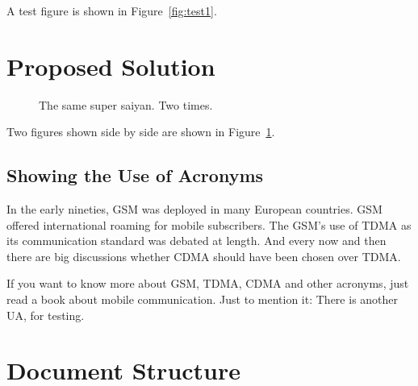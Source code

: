 A test figure is shown in Figure~\ref{fig:test1}.

\section{Proposed Solution} 

\blindtext
\blindtext

\begin{figure}[!ht]
    \centering
    \qquad
    \caption[Short Caption]{The same super saiyan. Two times.}        
    \label{fig:test2}
\end{figure}

Two figures shown side by side are shown in Figure~\ref{fig:test2}.

\subsection{Showing the Use of Acronyms}

In the early nineties, \acs{GSM} was deployed in many European countries. \ac{GSM} offered international roaming for mobile subscribers. The \acs{GSM}’s use of \ac{TDMA} as its communication standard was debated at length. And every now and then there are big discussions whether \ac{CDMA} should have been chosen over \ac{TDMA}.

If you want to know more about \acf{GSM}, \acf{TDMA}, \acf{CDMA} and other acronyms, just read a book about mobile communication. Just to mention it: There is another \ac{UA}, for testing.


\section{Document Structure}

\blindtext
